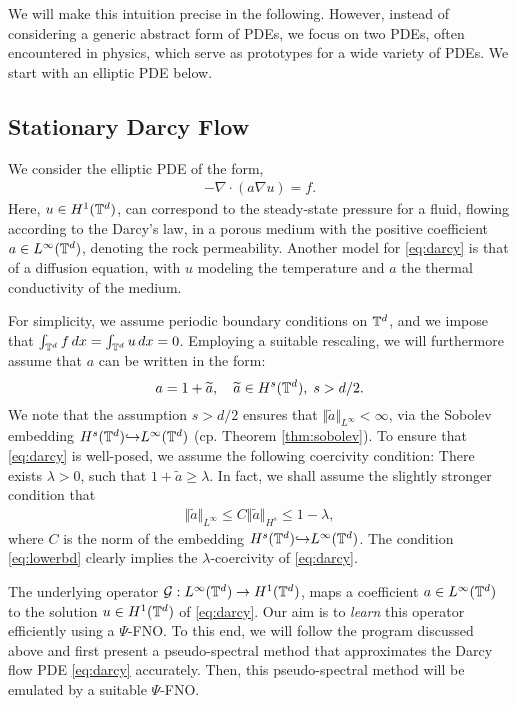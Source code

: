 \documentclass[reqno,a4paper]{amsart}
\begin{document}
We will make this intuition precise in the following. However, instead of considering a generic abstract form of PDEs, we focus on two PDEs, often encountered in physics, which serve as prototypes for a wide variety of PDEs. We start with an elliptic PDE below.
\subsection{Stationary Darcy Flow}
\label{sec:darcy}
We consider the elliptic PDE of the form,
\begin{align} \label{eq:darcy}
-\nabla \cdot (a\nabla u) = f.
\end{align}
Here, $u \in H^1(\mathbb{T}^d)$, can correspond to the steady-state pressure for a fluid, flowing according to the Darcy's law, in a porous medium with the positive coefficient $a \in L^\infty(\mathbb{T}^d)$, denoting the rock permeability. Another model for \eqref{eq:darcy} is that of a diffusion equation, with $u$ modeling the temperature and $a$ the thermal conductivity of the medium. 

For simplicity,  we assume periodic boundary conditions on $\mathbb{T}^d$, and we impose that $\int_{\mathbb{T}^d} f \, dx = \int_{\mathbb{T}^d} u \, dx = 0$. Employing a suitable rescaling, we will furthermore assume that $a$ can be written in the form:
\[
a = 1 + \widetilde{a}, \quad \widetilde{a}\in H^s(\mathbb{T}^d), \; s>d/2.
\]
We note that the assumption $s>d/2$ ensures that $\Vert \tilde{a} \Vert_{L^\infty} < \infty$, via the Sobolev embedding $H^s(\mathbb{T}^d) {\hookrightarrow} L^\infty(\mathbb{T}^d)$ (cp. Theorem \ref{thm:sobolev}). To ensure that \eqref{eq:darcy} is well-posed, we assume the following coercivity condition: There exists $\lambda > 0$, such that $1 + \tilde{a} \ge \lambda$. In fact, we shall assume the slightly stronger condition that 
\begin{align} \label{eq:lowerbd}
\Vert \tilde{a} \Vert_{L^\infty}
\le
C\Vert \tilde{a} \Vert_{H^s} 
\le 1-\lambda,
\end{align}
where $C$ is the norm of the embedding $H^s(\mathbb{T}^d){\hookrightarrow} L^\infty(\mathbb{T}^d)$. The condition \eqref{eq:lowerbd}
clearly implies the $\lambda$-coercivity of \eqref{eq:darcy}.

The underlying operator $\mathcal{G}: L^\infty(\mathbb{T}^d) \to H^1(\mathbb{T}^d)$, maps a coefficient $a \in L^\infty(\mathbb{T}^d)$ to the solution $u \in H^1(\mathbb{T}^d)$ of \eqref{eq:darcy}. Our aim is to \emph{learn} this operator efficiently using a $\Psi$-FNO. To this end, we will follow the program discussed above and first present a pseudo-spectral method that approximates the Darcy flow PDE \eqref{eq:darcy} accurately. Then, this pseudo-spectral method will be emulated by a suitable $\Psi$-FNO. 
\end{document}
